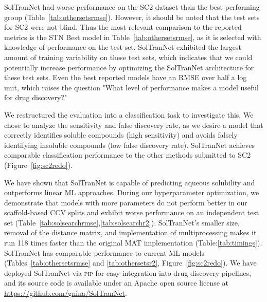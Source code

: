 \documentclass[journal=jcim,manuscript=applicationnotes]{achemso}
\begin{document}
SolTranNet had worse performance on the SC2 dataset than the best performing group (Table~\ref{tab:othersetsrmse}).
However, it should be noted that the test sets for SC2 were not blind.
Thus the most relevant comparison to the reported metrics is the STN Best model in Table~\ref{tab:othersetsrmse}, as it is selected with knowledge of performance on the test set.
SolTranNet exhibited the largest amount of training variability on these test sets, which indicates that we could potentially increase performance by optimizing the SolTranNet architecture for these test sets.
Even the best reported models have an RMSE over half a log unit, which raises the question "What level of performance makes a model useful for drug discovery?"

We restructured the evaluation into a classification task to investigate this. 
We chose to analyze the sensitivity and false discovery rate, as we desire a model that correctly identifies soluble compounds (high sensitivity) and avoids falsely identifying insoluble compounds (low false discovery rate).
SolTranNet achieves comparable classification performance to the other methods submitted to SC2 (Figure~\ref{fig:sc2redo}).

We have shown that SolTranNet is capable of predicting aqueous solubility and outperforms linear ML approaches.
During our hyperparameter optimization, we demonstrate that models with more parameters do not perform better in our scaffold-based CCV splits and exhibit worse performance on an independent test set (Table~\ref{tab:solsearchrmse},\ref{tab:solsearchr2}).
SolTranNet's smaller size, removal of the distance matrix, and implementation of multiprocessing makes it run 118 times faster than the original MAT implementation (Table:\ref{tab:timings}).
SolTranNet has comparable performance to current ML models (Tables~\ref{tab:othersetsrmse} and \ref{tab:othersetsr2}, Figure~\ref{fig:sc2redo}).
We have deployed SolTranNet via \textsc{pip} for easy integration into drug discovery pipelines, and its source code is available under an Apache open source license at \url{https://github.com/gnina/SolTranNet}.
\end{document}
